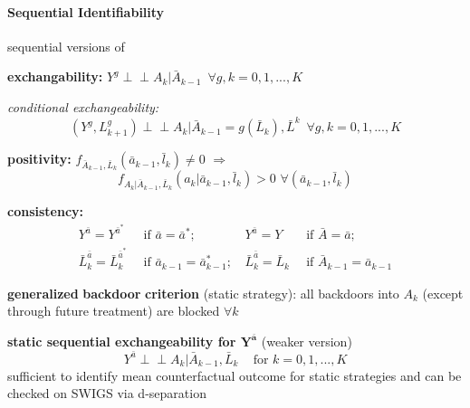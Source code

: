 \documentclass[8pt,twoside]{extarticle}
\newcommand{\indep}{\perp \!\!\! \perp}
\begin{document}
\begin{multicols}{2}
{\begin{minipage}{28em}
\end{minipage}}

\vspace{1.5em}

 \colorbox{lightgray!20!white}{\begin{minipage}{28em}


\paragraph{Sequential Identifiability} sequential versions of

 \textbf{exchangability:}
$Y^g \indep A_k| \bar{A}_{k-1} \,\,\, \forall g, k=0,1,...,K$

\textit{conditional exchangeability:}
$$\left(Y^g, L^g_{k+1}\right) \indep A_k| \bar{A}_{k-1} {=} g\left(\bar{L}_k\right), \bar{L}^k \,\,\, \forall g, k=0,1,...,K$$

 \textbf{positivity:} $f_{\bar{A}_{k-1},\bar{L}_k}(\bar{a}_{k-1},\bar{l}_k)\neq 0 \,\, \Rightarrow$
$$ f_{A_k|\bar{A}_{k-1},\bar{L}_k}(a_k|\bar{a}_{k-1},\bar{l}_k)>0 \,\, \forall \left(\bar{a}_{k-1},\bar{l}_k\right)$$

 \textbf{consistency:} 
\begin{align*}
Y^{\bar{a}} = Y^{\bar{a}^*} & \, \text{ if } {\bar{a}} = {\bar{a}^*};  & \,
Y^{\bar{a}} = Y & \, \text{ if } {\bar{A}} = {\bar{a}};  \\
\bar{L}^{\bar{a}}_k = \bar{L}^{\bar{a}^*}_k & \, \text{ if } {\bar{a}_{k-1}} = {\bar{a}^*_{k-1}}; & \,
\bar{L}^{\bar{a}}_k = \bar{L}_k & \, \text{ if } {\bar{A}_{k-1}} = {\bar{a}_{k-1}}
\end{align*}

\end{minipage}}

\vspace{1.5em}

 \colorbox{lightgray!20!white}{\begin{minipage}{28em}


 \textbf{generalized\,\,backdoor\,\,criterion} (static strategy): all backdoors into $A_k$ (except through future treatment) are blocked $\forall k$ 


 \textbf{static sequential exchangeability for $\boldsymbol{Y^{\bar{a}}}$} (weaker version)
$$Y^{\bar{a}} \indep A_k| \bar{A}_{k-1}, \bar{L}_k \,\,\,\,\, \text{ for } k=0,1,...,K$$
sufficient to identify mean counterfactual outcome for static strategies and can be checked on SWIGS via d-separation


\end{minipage}}
\end{multicols}
\end{document}
